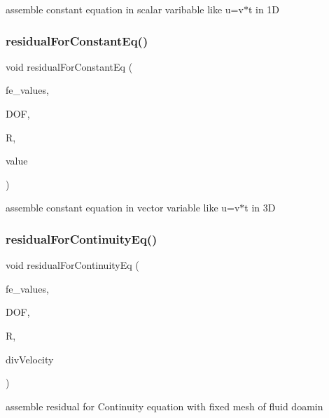 assemble constant equation in scalar varibable like u=v$\ast$t in 1D \mbox{\label{class_residual_a5d0f09e08ac7a6603bab9f192fd3c109}} 
\subsubsection{\texorpdfstring{residualForConstantEq()}{residualForConstantEq()}\hspace{0.1cm}{\footnotesize\ttfamily [2/2]}}
{\footnotesize\ttfamily void residual\+For\+Constant\+Eq (\begin{DoxyParamCaption}\item[{const F\+E\+Values$<$ dim $>$ \&}]{fe\+\_\+values,  }\item[{unsigned int}]{D\+OF,  }\item[{dealii\+::\+Table$<$ 1, T $>$ \&}]{R,  }\item[{dealii\+::\+Table$<$ 2, T $>$ \&}]{value }\end{DoxyParamCaption})}

assemble constant equation in vector variable like u=v$\ast$t in 3D \mbox{\label{class_residual_a882f4595a6547599cfe8f65897f45896}} 
\subsubsection{\texorpdfstring{residualForContinuityEq()}{residualForContinuityEq()}\hspace{0.1cm}{\footnotesize\ttfamily [1/2]}}
{\footnotesize\ttfamily void residual\+For\+Continuity\+Eq (\begin{DoxyParamCaption}\item[{const F\+E\+Values$<$ dim $>$ \&}]{fe\+\_\+values,  }\item[{unsigned int}]{D\+OF,  }\item[{Table$<$ 1, T $>$ \&}]{R,  }\item[{Table$<$ 1, T $>$ \&}]{div\+Velocity }\end{DoxyParamCaption})}

assemble residual for Continuity equation with fixed mesh of fluid doamin \mbox{\label{class_residual_afddbdda003424f242266894fdd1f7b1a}} 
